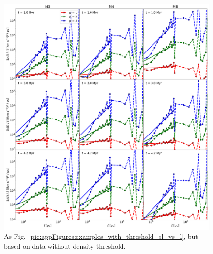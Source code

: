  	
\begin{figure}
    \centering
    \includegraphics[width=\textwidth]{app_examples_woutthres_sl_l.pdf}
    \caption{
        As Fig.~\ref{pic:appFigures:examples_with_threshold_sl_vs_l}, but based on data without density threshold.
    }
    \label{pic:appFigures:examples_without_threshold_sl_vs_l}
\end{figure}


